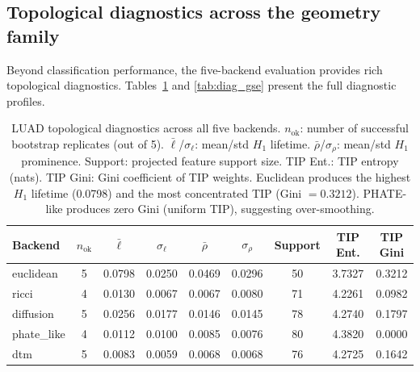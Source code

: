 \documentclass[11pt]{article}
\begin{document}
\subsection{Topological diagnostics across the geometry family}

Beyond classification performance, the five-backend evaluation provides rich topological diagnostics.
Tables~\ref{tab:diag_luad} and \ref{tab:diag_gse} present the full diagnostic profiles.

\begin{table}[h]
\centering
\small
\begin{tabular}{lcccccccc}
\toprule
Backend & $n_{\text{ok}}$ & $\bar{\ell}$ & $\sigma_\ell$ & $\bar{\rho}$ & $\sigma_\rho$ & Support & TIP Ent. & TIP Gini \\
\midrule
euclidean & 5 & 0.0798 & 0.0250 & 0.0469 & 0.0296 & 50 & 3.7327 & 0.3212 \\
ricci & 4 & 0.0130 & 0.0067 & 0.0067 & 0.0080 & 71 & 4.2261 & 0.0982 \\
diffusion & 5 & 0.0256 & 0.0177 & 0.0146 & 0.0145 & 78 & 4.2740 & 0.1797 \\
phate\_like & 4 & 0.0112 & 0.0100 & 0.0085 & 0.0076 & 80 & 4.3820 & 0.0000 \\
dtm & 5 & 0.0083 & 0.0059 & 0.0068 & 0.0068 & 76 & 4.2725 & 0.1642 \\
\bottomrule
\end{tabular}
\caption{LUAD topological diagnostics across all five backends.
$n_{\text{ok}}$: number of successful bootstrap replicates (out of 5).
$\bar{\ell}$/$\sigma_\ell$: mean/std $H_1$ lifetime.
$\bar{\rho}$/$\sigma_\rho$: mean/std $H_1$ prominence.
Support: projected feature support size.
TIP Ent.: TIP entropy (nats).
TIP Gini: Gini coefficient of TIP weights.
Euclidean produces the highest $H_1$ lifetime (0.0798) and the most concentrated TIP (Gini $= 0.3212$).
PHATE-like produces zero Gini (uniform TIP), suggesting over-smoothing.}
\label{tab:diag_luad}
\end{table}
\end{document}
